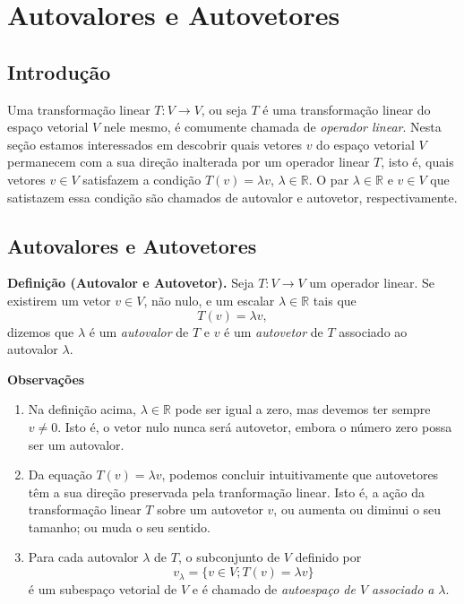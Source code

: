 \chapter{Autovalores e Autovetores}
\thispagestyle{empty}

\section{Introdução}

Uma transformação linear $T: V \rightarrow V$, ou seja $T$ é uma transformação linear do espaço vetorial $V$ nele mesmo,  é comumente chamada de \textit{operador linear}. Nesta seção estamos interessados em descobrir quais vetores $v$ do espaço vetorial $V$ permanecem com a sua direção inalterada por um operador linear  $T$, isto é, quais vetores $v \in V$ satisfazem a condição  $T(v)=\lambda v$, $ \lambda \in \mathbb{R}$. O par $\lambda \in \mathbb{R}$ e $v \in V$ que satistazem essa condição são chamados de autovalor e autovetor, respectivamente.

\section{Autovalores e Autovetores}
\textbf{Definição (Autovalor e Autovetor).} Seja $T: V \rightarrow V$ um operador linear. Se existirem um vetor $v \in V$,  não nulo, e um escalar $ \lambda \in \mathbb{R}$ tais que $$ T(v)=\lambda v,$$ dizemos que $\lambda$ é um \textit{autovalor} de $T$ e $v$ é um \textit{autovetor} de $T$ associado ao autovalor $\lambda$.

\textbf{Observações}

\begin{enumerate}
\item Na definição acima, $\lambda \in \mathbb{R}$  pode ser igual a zero, mas  devemos ter sempre $v\neq 0$. Isto é,  o vetor nulo  nunca será  autovetor, embora o número zero possa ser um autovalor.
\item Da equação $ T(v)=\lambda v$, podemos concluir intuitivamente que autovetores têm a sua direção preservada pela tranformação linear. Isto é, a ação da transformação linear $T$ sobre um autovetor $v$, ou aumenta ou diminui o seu tamanho; ou muda o seu sentido.
\item Para cada autovalor $\lambda$ de $T$, o subconjunto de $V$ definido por   $$v_{\lambda}=\{ v \in V; T(v)=\lambda v\}$$ é um subespaço vetorial de $V$ e é chamado de \textit{autoespaço de $V$ associado a} $\lambda$.
\end{enumerate}

